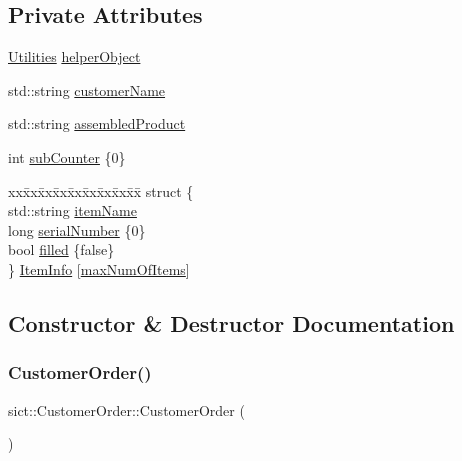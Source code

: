 \subsection*{Private Attributes}
\begin{DoxyCompactItemize}
\item 
\mbox{\hyperlink{classsict_1_1Utilities}{Utilities}} \mbox{\hyperlink{classsict_1_1CustomerOrder_aca4b0128f3b55c8e365dc60d04aacf79}{helper\+Object}}
\item 
std\+::string \mbox{\hyperlink{classsict_1_1CustomerOrder_ab5eced30421d9304bdc7fc582d15b8be}{customer\+Name}}
\item 
std\+::string \mbox{\hyperlink{classsict_1_1CustomerOrder_a996887895e1f451af8ed6bb98e264d3a}{assembled\+Product}}
\item 
int \mbox{\hyperlink{classsict_1_1CustomerOrder_a52bdf9922af30efda2b5211f70989ff8}{sub\+Counter}} \{0\}
\item 
\begin{tabbing}
xx\=xx\=xx\=xx\=xx\=xx\=xx\=xx\=xx\=\kill
struct \{\\
\>std::string \mbox{\hyperlink{classsict_1_1CustomerOrder_a9f793b8145c109006bdd2e0b69bc0bde}{itemName}}\\
\>long \mbox{\hyperlink{classsict_1_1CustomerOrder_a5321848f09f30cc02d7652346ab89eca}{serialNumber}} \{0\}\\
\>bool \mbox{\hyperlink{classsict_1_1CustomerOrder_af2cdb680c7adf2525e55f4f86664cde0}{filled}} \{false\}\\
\} \mbox{\hyperlink{classsict_1_1CustomerOrder_a34aff2d1d0c63c3da8f98c266c79635b}{ItemInfo}} \mbox{[}\mbox{\hyperlink{namespacesict_a013c6a3783ee25d56c3428256fbea776}{maxNumOfItems}}\mbox{]}\\

\end{tabbing}\end{DoxyCompactItemize}


\subsection{Constructor \& Destructor Documentation}
\mbox{\label{classsict_1_1CustomerOrder_a0cc13a97cc040386a711d131a7dbbb95}} 
\subsubsection{\texorpdfstring{CustomerOrder()}{CustomerOrder()}\hspace{0.1cm}{\footnotesize\ttfamily [1/3]}}
{\footnotesize\ttfamily sict\+::\+Customer\+Order\+::\+Customer\+Order (\begin{DoxyParamCaption}{ }\end{DoxyParamCaption})}

